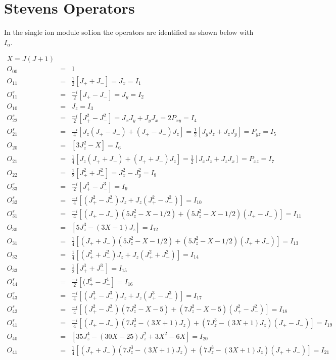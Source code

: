 \section{Stevens Operators}\label{stevens}

In the single ion
module {\prg so1ion} the operators are identified as shown below with $I_{\alpha}$.

\begin{eqnarray*}
X=J(J+1)\\
O_{00}&=&1\\
\hline
O_{11}&=&\frac{1}{2}[J_++J_-]=J_x=I_1 \\
O^s_{11}&=&\frac{-i}{2}[J_+-J_-]=J_y=I_2 \\
O_{10}&=&J_z=I_3 \\
\hline
O^s_{22}&=&\frac{-i}{2}[J_+^2-J_-^2]=J_xJ_y+J_yJ_x=2P_{xy}=I_4 \\
O^s_{21}&=&\frac{-i}{4}[J_z(J_+-J_-)+(J_+-J_-)J_z]=\frac{1}{2}[J_yJ_z+J_zJ_y]=P_{yz}=I_5 \\
O_{20}&=&[3J_z^2-X]=I_6 \\
O_{21}&=&\frac{1}{4}[J_z(J_++J_-)+(J_++J_-)J_z]=\frac{1}{2}[J_xJ_z+J_zJ_x]=P_{xz}=I_7 \\
O_{22}&=&\frac{1}{2}[J_+^2+J_-^2]=J_x^2-J_y^2 =I_8\\
\hline
O^s_{33}&=&\frac{-i}{2}[J_+^3-J_-^3]=I_9 \\
O^s_{32}&=&\frac{-i}{4}[(J_+^2-J_-^2)J_z+J_z(J_+^2-J_-^2)]=I_{10} \\
O^s_{31}&=&\frac{-i}{4}[(J_+-J_-)(5J_z^2-X-1/2)+(5J_z^2-X-1/2)(J_+-J_-)]=I_{11} \\
O_{30}&=&[5J_z^3-(3X-1)J_z]=I_{12} \\
O_{31}&=&\frac{1}{4}[(J_++J_-)(5J_z^2-X-1/2)+(5J_z^2-X-1/2)(J_++J_-)] =I_{13}\\
O_{32}&=&\frac{1}{4}[(J_+^2+J_-^2)J_z+J_z(J_+^2+J_-^2)]=I_{14} \\
O_{33}&=&\frac{1}{2}[J_+^3+J_-^3]=I_{15} \\
\hline
O^s_{44}&=&\frac{-i}{2}[(J_+^4-J_-^4]=I_{16}\\
O^s_{43}&=&\frac{-i}{4}[(J_+^3-J_-^3)J_z+J_z(J_+^3-J_-^3)] =I_{17}\\
O^s_{42}&=&\frac{-i}{4}[(J_+^2-J_-^2)(7J_z^2-X-5)+(7J_z^2-X-5)(J_+^2-J_-^2)]=I_{18} \\
O^s_{41}&=&\frac{-i}{4}[(J_+-J_-)(7J_z^3-(3X+1)J_z)+(7J_z^3-(3X+1)J_z)(J_+-J_-)]=I_{19} \\
O_{40}&=&[35J_z^4-(30X-25)J_z^2+3X^2-6X]=I_{20} \\
O_{41}&=&\frac{1}{4}[(J_++J_-)(7J_z^3-(3X+1)J_z)+(7J_z^3-(3X+1)J_z)(J_++J_-)]=I_{21} \\

\end{eqnarray*}
